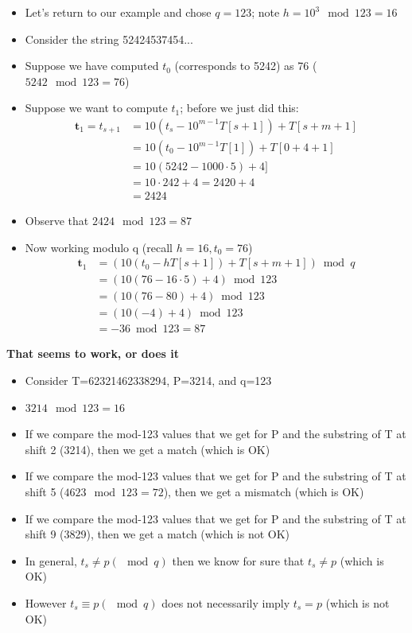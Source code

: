 \documentclass{article}[18pt]
\begin{document}
\begin{itemize}
	\item Let's return to our example and chose $q=123$; note $h=10^3\mod 123=16$
	\item Consider the string 52424537454...
	\item Suppose we have computed $t_0$ (corresponds to 5242) as 76 ($5242 \mod 123=76$)
	\item Suppose we want to compute $t_1$; before we just did this:
	\[ 
	\begin{aligned} \mathbf{t}_{1}=t_{s+1} &=10\left(t_{s}-10^{m-1} T[s+1]\right)+T[s+m+1] \\ &=10\left(t_{0}-10^{m-1} T[1]\right)+T[0+4+1] \\ &=10(5242-1000 \cdot 5)+4 ] \\ &=10 \cdot 242+4=2420+4 \\ &=2424 \end{aligned}
	\]
	\item Observe that $2424\mod 123=87$
	\item Now working modulo q (recall $h=16, t_0=76$)
	\[ 
	\begin{aligned} \mathbf{t}_{1} &=\left(10\left(t_{0}-h T[s+1]\right)+T[s+m+1]\right) \bmod q \\ &=(10(76-16 \cdot 5)+4) \bmod 123 \\ &=(10(76-80)+4) \bmod 123 \\ &=(10(-4)+4) \bmod 123 \\ &=-36 \bmod 123=87 \end{aligned}
	\]
\end{itemize}
\textbf{That seems to work, or does it}
\begin{itemize}
	\item Consider T=62321462338294, P=3214, and q=123
	\item $3214\mod 123=16$
	\item If we compare the mod-123 values that we get for P and the substring of T at shift 2 (3214), then we get a match (which is OK)
	\item If we compare the mod-123 values that we get for P and the substring of T at shift 5 ($4623\mod 123=72$), then we get a mismatch (which is OK)
	\item If we compare the mod-123 values that we get for P and the substring of T at shift 9 (3829), then we get a match (which is not OK)
	\item In general, $t_s\neq p (\mod q)$ then we know for sure that $t_s\neq p$ (which is OK)
	\item However $t_s\equiv p (\mod q)$ does not necessarily imply $t_s=p$ (which is not OK)
\end{itemize}
\end{document}
